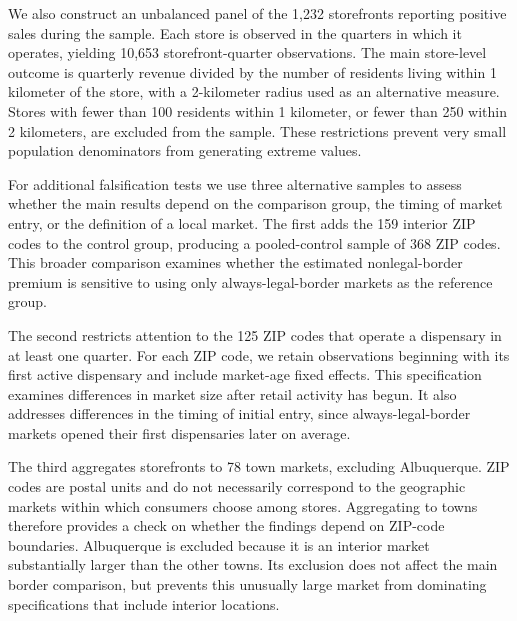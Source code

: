\documentclass[english,12pt]{article}
\begin{document}
We also construct an unbalanced panel of the 1,232 storefronts reporting positive sales during the sample. Each store is observed in the quarters in which it operates, yielding 10,653 storefront-quarter observations. The main store-level outcome is quarterly revenue divided by the number of residents living within 1 kilometer of the store, with a 2-kilometer radius used as an alternative measure.
Stores with fewer than 100 residents within 1 kilometer, or fewer than 250 within 2 kilometers, are excluded from the sample. These restrictions prevent very small population denominators from generating extreme values.

For additional falsification tests we use three alternative samples to assess whether the main results depend on the comparison group, the timing of market entry, or the definition of a local market.
The first adds the 159 interior ZIP codes to the control group, producing a pooled-control sample of 368 ZIP codes. This broader comparison examines whether the estimated nonlegal-border premium is sensitive to using only always-legal-border markets as the reference group.

The second restricts attention to the 125 ZIP codes that operate a dispensary in at least one quarter. For each ZIP code, we retain observations beginning with its first active dispensary and include market-age fixed effects. This specification examines differences in market size after retail activity has begun. It also addresses differences in the timing of initial entry, since always-legal-border markets opened their first dispensaries later on average.

The third aggregates storefronts to 78 town markets, excluding Albuquerque. ZIP codes are postal units and do not necessarily correspond to the geographic markets within which consumers choose among stores. Aggregating to towns therefore provides a check on whether the findings depend on ZIP-code boundaries. Albuquerque is excluded because it is an interior market substantially larger than the other towns. Its exclusion does not affect the main border comparison, but prevents this unusually large market from dominating specifications that include interior locations.
\end{document}
